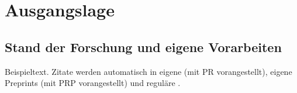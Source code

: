 \section{Ausgangslage}
\subsection{Stand der Forschung und eigene Vorarbeiten}\label{sec:stateoftheart}

Beispieltext. Zitate werden automatisch in eigene (mit PR vorangestellt), eigene Preprints (mit PRP vorangestellt) und reguläre \parencite{sauter2020, weiss_small_2020,koster_snakemakescalable_2012,vendrami_rad_2017}.